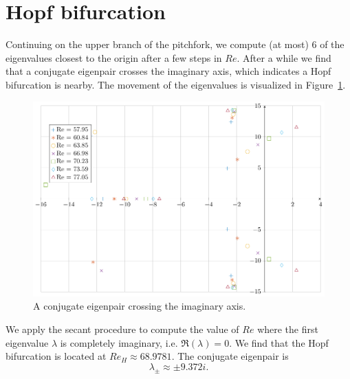 \section{Hopf bifurcation}

Continuing on the upper branch of the pitchfork, we compute (at most) 6 of the eigenvalues closest to the origin after a few steps in $Re.$ After a while we find that a conjugate eigenpair crosses the imaginary axis, which indicates a Hopf bifurcation is nearby. The movement of the eigenvalues is visualized in Figure~\ref{fig:eigenpair_crossing_imag}.

\begin{figure}[h]
  \caption{A conjugate eigenpair crossing the imaginary axis.}
  \label{fig:eigenpair_crossing_imag}
  \centerline{\includegraphics[width=\textwidth]{images/eigenwaarden_hopf.pdf}}
\end{figure}

We apply the secant procedure to compute the value of $Re$ where the first eigenvalue $\lambda$ is completely imaginary, i.e. $\Re(\lambda) = 0.$ We find that the Hopf bifurcation is located at $Re_H \approx 68.9781.$ The conjugate eigenpair is $$\lambda_\pm \approx \pm 9.372i.$$

